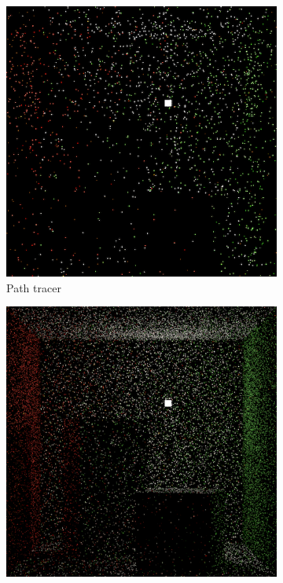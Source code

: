 \begin{figure}
    \centering
    \begin{subfigure}[b]{0.32\textwidth}
        \centering
        \includegraphics[width=\textwidth]{images/03-sampling_path.jpg}
        \caption{Path tracer}
        \vspace*{5mm}
        \label{fig:methods_sampling_path}
    \end{subfigure}
    \hfill
    \begin{subfigure}[b]{0.32\textwidth}
        \centering
        \includegraphics[width=\textwidth]{images/03-sampling_bdpt.jpg}

\end{subfigure}
\end{figure}

